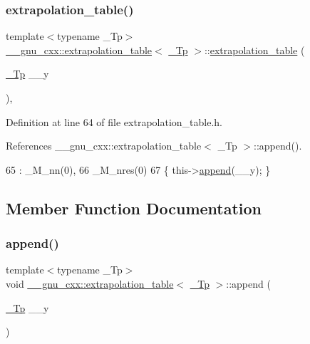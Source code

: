 \subsubsection{\texorpdfstring{extrapolation\+\_\+table()}{extrapolation\_table()}\hspace{0.1cm}{\footnotesize\ttfamily [2/2]}}
{\footnotesize\ttfamily template$<$typename \+\_\+\+Tp$>$ \\
\hyperlink{class____gnu__cxx_1_1extrapolation__table}{\+\_\+\+\_\+gnu\+\_\+cxx\+::extrapolation\+\_\+table}$<$ \hyperlink{namespace____gnu__cxx_a3b19a9c800ca194374ef9172290f7d79}{\+\_\+\+Tp} $>$\+::\hyperlink{class____gnu__cxx_1_1extrapolation__table}{extrapolation\+\_\+table} (\begin{DoxyParamCaption}\item[{\hyperlink{namespace____gnu__cxx_a3b19a9c800ca194374ef9172290f7d79}{\+\_\+\+Tp}}]{\+\_\+\+\_\+y }\end{DoxyParamCaption})\hspace{0.3cm}{\ttfamily [inline]}, {\ttfamily [explicit]}}



Definition at line 64 of file extrapolation\+\_\+table.\+h.



References \+\_\+\+\_\+gnu\+\_\+cxx\+::extrapolation\+\_\+table$<$ \+\_\+\+Tp $>$\+::append().


\begin{DoxyCode}
65       : \_M\_nn(0),
66         \_M\_nres(0)
67       \{ this->\hyperlink{class____gnu__cxx_1_1extrapolation__table_a0a20b6d8a3c194a962ce6f1bba96f5e9}{append}(\_\_y); \}
\end{DoxyCode}


\subsection{Member Function Documentation}
\mbox{\label{class____gnu__cxx_1_1extrapolation__table_a0a20b6d8a3c194a962ce6f1bba96f5e9}} 
\subsubsection{\texorpdfstring{append()}{append()}}
{\footnotesize\ttfamily template$<$typename \+\_\+\+Tp$>$ \\
void \hyperlink{class____gnu__cxx_1_1extrapolation__table}{\+\_\+\+\_\+gnu\+\_\+cxx\+::extrapolation\+\_\+table}$<$ \hyperlink{namespace____gnu__cxx_a3b19a9c800ca194374ef9172290f7d79}{\+\_\+\+Tp} $>$\+::append (\begin{DoxyParamCaption}\item[{\hyperlink{namespace____gnu__cxx_a3b19a9c800ca194374ef9172290f7d79}{\+\_\+\+Tp}}]{\+\_\+\+\_\+y }\end{DoxyParamCaption})\hspace{0.3cm}{\ttfamily [inline]}}



